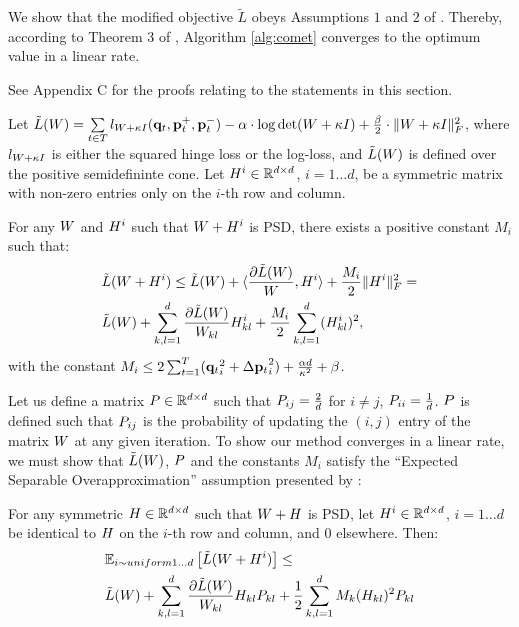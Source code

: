 \documentclass{article}
\begin{document}
We show that the modified objective $\tilde{L}$ obeys Assumptions $1$ and $2$ of \citet{richtarik2013optimal}. Thereby, according to Theorem 3 of \citeauthor{richtarik2013optimal}, Algorithm \ref{alg:comet} converges to the optimum value in a linear rate.

See Appendix C for the proofs relating to the statements in this section.
\begin{lemma}
\label{lem:smooth}
Let $\tilde{L}({W})=\sum\limits_{t\in T}{l_{{W} + \kappa I}(\mathbf{q}_t, \mathbf{p}_{t}^{+}, \mathbf{p}_{t}^{-})} - \alpha \cdot \log \det({W} + \kappa I) + \tfrac{\beta}{2}  \cdot \| {W} + \kappa I \|_{F}^{2}$, where $l_{{W} + \kappa I}$ is either the squared hinge loss or the log-loss, and $\tilde{L}({W})$ is defined over the positive semidefininte cone. 
Let ${H}^i \in \mathbb{R}^{d \times d}$, $i=1 \ldots d$, be a symmetric matrix with non-zero entries only on the $i$-th row and column.

For any ${W}$ and ${H}^i$ such that ${W} + {H}^i$ is PSD, there exists a positive constant $M_i$ such that:
\begin{align}
\label{eq:ineq}
&\tilde{L}({W} + {H}^i) \leq \tilde{L}({W}) + \langle \frac{\partial \tilde{L}({W})}{{W}}, {H}^i \rangle + \frac{M_i}{2} {\|{H}^i\|_F^2} = \\
&\tilde{L}({W}) + \sum_{k,l=1}^d  \frac{\partial \tilde{L}({W})}{{W}_{kl}} {H}_{kl}^i + \frac{M_i}{2} \sum_{k,l=1}^d  ({H}_{kl}^i)^2, \nonumber
\end{align}
with the constant $M_i \leq  2 \sum_{t=1}^T ({{\mathbf{q}}_{{t}}}_i^2 +{\Delta\mathbf{p}_{t}}_i^2) + \frac{\alpha d}{\kappa ^2} + \beta$.

\end{lemma}

Let us define a matrix ${P} \in \mathbb{R}^{d \times d}$ such that ${P}_{ij} = \frac{2}{d}$ for $i \ne j$, ${P}_{ii} = \frac{1}{d}$. ${P}$ is defined such that ${P}_{ij}$ is the probability of updating the $(i,j)$ entry of the matrix ${W}$ at any given iteration. To show our method converges in a linear rate, we must show that $\tilde{L}({W})$, ${P}$ and the constants $M_i$ satisfy the ``Expected Separable Overapproximation'' assumption presented by \citet{richtarik2013optimal}:

\begin{lemma}\label{lem:ESO}
For any symmetric ${H} \in \mathbb{R}^{d \times d}$ such that ${W} + {H}$ is PSD, let ${H}^i \in \mathbb{R}^{d \times d}$, $i=1 \ldots d$ be identical to ${H}$  on the $i$-th row and column, and $0$ elsewhere. Then:
\begin{align*}
&\mathbb{E}_{i \sim uniform 1 \ldots d} \left[ \tilde{L}({W} + {H}^i) \right] \leq \\
&\tilde{L}({W}) + \sum_{k,l=1}^d  \frac{\partial \tilde{L}({W})}{{W}_{kl}} {H}_{kl} {P}_{kl} + \frac{1}{2} \sum_{k,l=1}^d   M_k ({H}_{kl})^2 {P}_{kl}
\end{align*}
\end{lemma}
\end{document}
